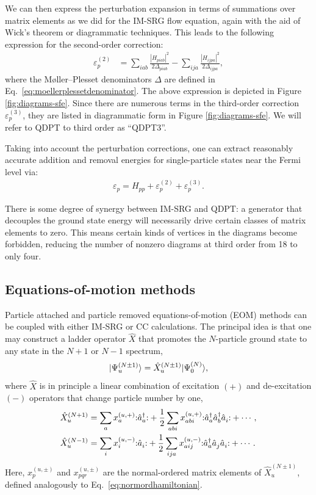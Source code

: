 We can then express the perturbation expansion in terms of summations over matrix elements as we did for the IM-SRG flow equation, again with the aid of Wick's theorem or diagrammatic techniques.  This leads to the following expression for the second-order correction:
\begin{align*}
  \varepsilon_p^{(2)}
  &=
    \sum_{i a b} \frac{|H_{p i a b}|^2}{2 \Delta_{p i a b}}
    - \sum_{i j a} \frac{|H_{i j p a}|^2}{2 \Delta_{i j p a}},
\end{align*}
where the M\o ller--Plesset denominators $\Delta$ are defined in Eq.\ \eqref{eq:moellerplessetdenominator}.  The above expression is depicted in Figure \ref{fig:diagrams-sfe}.  Since there are numerous terms in the third-order correction $\varepsilon_p^{(3)}$, they are listed in diagrammatic form in Figure \ref{fig:diagrams-sfe}.  We will refer to QDPT to third order as ``QDPT3''.

Taking into account the perturbation corrections, one can extract reasonably accurate addition and removal energies for single-particle states near the Fermi level via:
\begin{align*}
  \varepsilon_p = H_{p p} + \varepsilon_p^{(2)} + \varepsilon_p^{(3)}.
\end{align*}

There is some degree of synergy between IM-SRG and QDPT: a generator that decouples the ground state energy will necessarily drive certain classes of matrix elements to zero.  This means certain kinds of vertices in the diagrams become forbidden, reducing the number of nonzero diagrams at third order from 18 to only four.

\subsection{Equations-of-motion methods}

Particle attached and particle removed equations-of-motion (EOM) methods can be coupled with either IM-SRG or CC calculations. The principal idea is that one may construct a ladder operator $\hat{X}$ that promotes the $N$-particle ground state to any state in the $N + 1$ or $N - 1$ spectrum,
\begin{equation}\label{eq:ladder_def}
  | \Psi^{(N \pm 1)}_u \rangle  = \hat{X}^{(N \pm 1)}_u | \Psi^{(N)}_0 \rangle,
\end{equation}
where $\hat{X}$ is in principle a linear combination of excitation $(+)$ and de-excitation $(-)$ operators that change particle number by one,
\begin{align}
  \label{eq:gen_attached}
  \hat{X}^{(N + 1)}_u &= \sum_a x^{(u, +)}_a  \mathopen: \hat{a}^\dagger_a \mathclose: + \frac{1}{2} \sum_{a b i} x^{(u, +)}_{a b i} \mathopen: \hat{a}^\dagger_a \hat{a}^\dagger_b \hat{a}_i^{} \mathclose: + \cdots,  \\
  \label{eq:gen_removed}
  \hat{X}^{(N - 1)}_u &= \sum_i x_i^{(u, -)} \mathopen: \hat{a}_i^{} \mathclose: + \frac{1}{2} \sum_{i j a} x^{(u, -)}_{a i j} \mathopen: \hat{a}^\dagger_a \hat{a}_j^{} \hat{a}_i^{} \mathclose:  + \cdots.
\end{align}
Here, $x^{(u, \pm)}_p$ and $x^{(u, \pm)}_{p q r}$ are the normal-ordered matrix elements of $\hat{X}_u^{(N \pm 1)}$, defined analogously to Eq.\ \eqref{eq:normordhamiltonian}.

